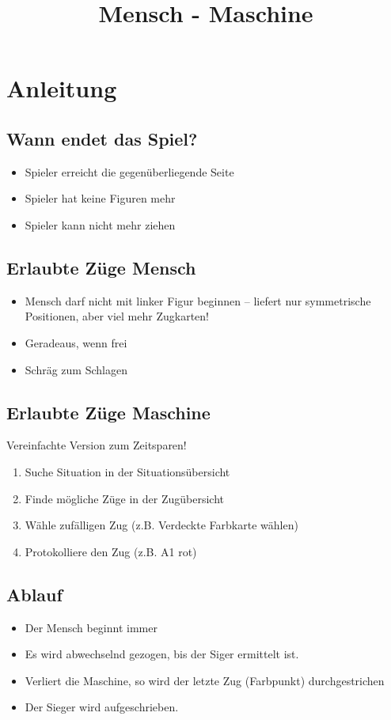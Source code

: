 \documentclass[12pt]{scrreprt}
\title{Mensch - Maschine}
\begin{document}
\section*{Anleitung}
\subsection*{Wann endet das Spiel?}
\begin{itemize}
	\item Spieler erreicht die gegenüberliegende Seite 
	\item Spieler hat keine Figuren mehr
	\item Spieler kann nicht mehr ziehen
\end{itemize}

\subsection*{Erlaubte Züge Mensch}
\begin{itemize}
	\item Mensch darf nicht mit linker Figur beginnen -- liefert nur symmetrische Positionen, aber viel mehr Zugkarten!
	\item Geradeaus, wenn frei
	\item Schräg zum Schlagen
\end{itemize}

\subsection*{Erlaubte Züge Maschine}
Vereinfachte Version zum Zeitsparen!

\begin{enumerate}
	\item Suche Situation in der Situationsübersicht
	\item Finde mögliche Züge in der Zugübersicht
	\item Wähle zufälligen Zug (z.B. Verdeckte Farbkarte wählen)
	\item Protokolliere den Zug (z.B. A1 rot)
\end{enumerate}

\subsection*{Ablauf}
\begin{itemize}
	\item Der Mensch beginnt immer
	\item Es wird abwechselnd gezogen, bis der Siger ermittelt ist.
	\item Verliert die Maschine, so wird der letzte Zug (Farbpunkt) durchgestrichen
	\item Der Sieger wird aufgeschrieben.
\end{itemize}
\end{document}
